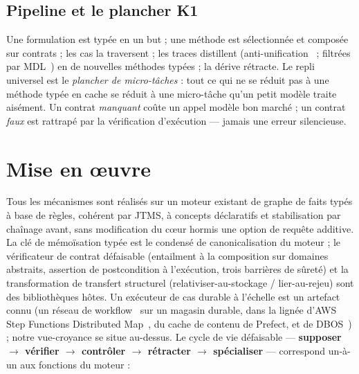 \documentclass[11pt]{article}
\newcommand{\K}{\textsf{K1}}
\begin{document}
\subsection{Pipeline et le plancher \K{}}
Une formulation est typée en un but ; une méthode est sélectionnée et composée sur contrats ; les cas la traversent ;
les traces distillent (anti-unification~\cite{plotkin1970} ; filtrées par MDL~\cite{ellis2021,bowers2023}) en de
nouvelles méthodes typées ; la dérive rétracte. Le repli universel est le \emph{plancher de micro-tâches} : tout ce
qui ne se réduit pas à une méthode typée en cache se réduit à une micro-tâche qu'un petit modèle traite aisément.
Un contrat \emph{manquant} coûte un appel modèle bon marché ; un contrat \emph{faux} est rattrapé par la
vérification d'exécution --- jamais une erreur silencieuse.

\section{Mise en œuvre}
Tous les mécanismes sont réalisés sur un moteur existant de graphe de faits typés à base de règles, cohérent par
JTMS, à concepts déclaratifs et stabilisation par chaînage avant, sans modification du cœur hormis une option de
requête additive. La clé de mémoïsation typée est le condensé de canonicalisation du moteur ; le vérificateur de
contrat défaisable (entailment à la composition sur domaines abstraits, assertion de postcondition à l'exécution,
trois barrières de sûreté) et la transformation de transfert structurel (relativiser-au-stockage /
lier-au-rejeu) sont des bibliothèques hôtes. Un exécuteur de cas durable à l'échelle est un artefact connu (un
réseau de workflow~\cite{vanderaalst1998} sur un magasin durable, dans la lignée d'AWS Step Functions Distributed
Map~\cite{aws2022}, du cache de contenu de Prefect, et de DBOS~\cite{dbos2022}) ; notre vue-croyance se situe
au-dessus. Le cycle de vie défaisable --- \textbf{supposer $\to$ vérifier $\to$ contrôler $\to$ rétracter $\to$
spécialiser} --- correspond un-à-un aux fonctions du moteur :
\end{document}
